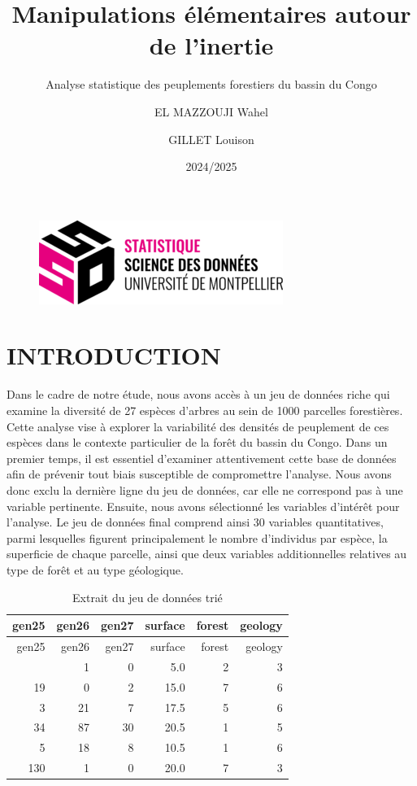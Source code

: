 \documentclass[
]{article}
\title{Manipulations élémentaires autour de l'inertie}
\subtitle{Analyse statistique des peuplements forestiers du bassin du
Congo}
\author{EL MAZZOUJI Wahel \and GILLET Louison}
\date{2024/2025}
\begin{document}
\maketitle

\begin{figure}[h!]
    \centering
    \includegraphics[width=0.5\linewidth]{ssd.png}
\end{figure}

\newpage

\tableofcontents

\newpage

\hypertarget{introduction}{%
\section{INTRODUCTION}\label{introduction}}

Dans le cadre de notre étude, nous avons accès à un jeu de données riche
qui examine la diversité de 27 espèces d'arbres au sein de 1000
parcelles forestières. Cette analyse vise à explorer la variabilité des
densités de peuplement de ces espèces dans le contexte particulier de la
forêt du bassin du Congo. Dans un premier temps, il est essentiel
d'examiner attentivement cette base de données afin de prévenir tout
biais susceptible de compromettre l'analyse. Nous avons donc exclu la
dernière ligne du jeu de données, car elle ne correspond pas à une
variable pertinente. Ensuite, nous avons sélectionné les variables
d'intérêt pour l'analyse. Le jeu de données final comprend ainsi 30
variables quantitatives, parmi lesquelles figurent principalement le
nombre d'individus par espèce, la superficie de chaque parcelle, ainsi
que deux variables additionnelles relatives au type de forêt et au type
géologique.

\begin{longtable}[]{@{}rrrrrr@{}}
\caption{Extrait du jeu de données trié}\tabularnewline
\toprule\noalign{}
gen25 & gen26 & gen27 & surface & forest & geology \\
\midrule\noalign{}
\endfirsthead
\toprule\noalign{}
gen25 & gen26 & gen27 & surface & forest & geology \\
\midrule\noalign{}
\endhead
\bottomrule\noalign{}
\endlastfoot
32 & 1 & 0 & 5.0 & 2 & 3 \\
19 & 0 & 2 & 15.0 & 7 & 6 \\
3 & 21 & 7 & 17.5 & 5 & 6 \\
34 & 87 & 30 & 20.5 & 1 & 5 \\
5 & 18 & 8 & 10.5 & 1 & 6 \\
130 & 1 & 0 & 20.0 & 7 & 3 \\
\end{longtable}
\end{document}
